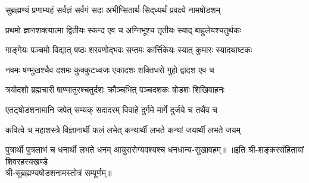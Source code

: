 
\twolineshloka
{सुब्रह्मण्यं प्रणाम्यहं सर्वज्ञं सर्वगं सदा}
{अभीप्सितार्थ-सिद्‌ध्यर्थं प्रवक्ष्ये नामषोडशम्}

\twolineshloka
{प्रथमो ज्ञानशक्त्यात्मा द्वितीयः स्कन्द एव च}
{अग्निभूश्च तृतीयः स्याद् बाहुलेयश्चतुर्थकः}

\twolineshloka
{गाङ्गेयः पञ्चमो विद्यात् षष्ठः शरवणोद्भवः}
{सप्तमः कार्त्तिकेयः स्यात् कुमारः स्यादथाष्टकः}

\twolineshloka
{नवमः षण्मुखश्चैव दशमः कुक्कुटध्वजः}
{एकादशः शक्तिधरो गुहो द्वादश एव च}

\twolineshloka
{त्रयोदशो ब्रह्मचारी षाण्मातुरश्चतुर्दशः}
{क्रौञ्चभित् पञ्चदशकः षोडशः शिखिवाहनः}

\twolineshloka
{एतट्षोडशनामानि जपेत् सम्यक् सदादरम्}
{विवाहे दुर्गमे मार्गे दुर्जये च तथैव च}

\twolineshloka
{कवित्वे च महाशस्त्रे विज्ञानार्थी फलं लभेत्}
{कन्यार्थी लभते कन्यां जयार्थी लभते जयम्}

\twolineshloka
{पुत्रार्थी पुत्रलाभं  च धनार्थी लभते धनम्}
{आयुरारोग्यवश्यश्च धनधान्य-सुखावहम्॥}
॥इति श्री-शङ्करसंहितायां शिवरहस्यखण्डे\\
श्री-सुब्रह्मण्यषोडशनामस्तोत्रं सम्पूर्णम्॥
